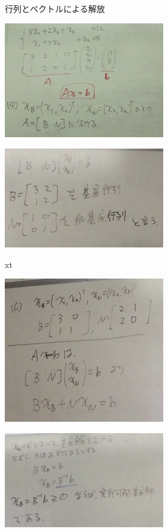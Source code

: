 \documentclass{jsarticle}
\begin{document}
{{\begin{description}
			{\large{行列とベクトルによる解放}}\\
			\begin{center}
				\includegraphics[width=7cm]{12_17_10.JPG}
			\end{center}
			\begin{center}
				\includegraphics[width=7cm]{12_17_11.JPG}
			\end{center}	xt
			\begin{center}
				\includegraphics[width=7cm]{12_17_12.JPG}
			\end{center}
			\begin{center}
				\includegraphics[width=7cm]{12_17_13.JPG}

\end{center}
\end{description}}}
\end{document}
